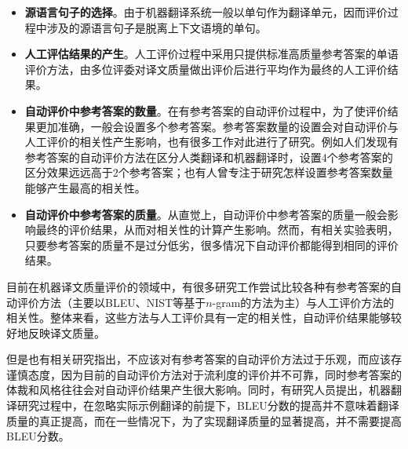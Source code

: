 \begin{itemize}
\vspace{0.5em}
\item {\small\sffamily\bfseries{源语言句子的选择}}。由于机器翻译系统一般以单句作为翻译单元，因而评价过程中涉及的源语言句子是脱离上下文语境的单句。
\vspace{0.5em}
\item {\small\sffamily\bfseries{人工评估结果的产生}}。人工评价过程中采用只提供标准高质量参考答案的单语评价方法，由多位评委对译文质量做出评价后进行平均作为最终的人工评价结果。
\vspace{0.5em}
\item {\small\sffamily\bfseries{自动评价中参考答案的数量}}。在有参考答案的自动评价过程中，为了使评价结果更加准确，一般会设置多个参考答案。参考答案数量的设置会对自动评价与人工评价的相关性产生影响，也有很多工作对此进行了研究。例如人们发现有参考答案的自动评价方法在区分人类翻译和机器翻译时，设置4个参考答案的区分效果远远高于2个参考答案；也有人曾专注于研究怎样设置参考答案数量能够产生最高的相关性。
\vspace{0.5em}
\item {\small\sffamily\bfseries{自动评价中参考答案的质量}}。从直觉上，自动评价中参考答案的质量一般会影响最终的评价结果，从而对相关性的计算产生影响。然而，有相关实验表明，只要参考答案的质量不是过分低劣，很多情况下自动评价都能得到相同的评价结果。
\vspace{0.5em}
\end{itemize}

\parinterval 目前在机器译文质量评价的领域中，有很多研究工作尝试比较各种有参考答案的自动评价方法（主要以BLEU、NIST等基于$n$-gram的方法为主）与人工评价方法的相关性。整体来看，这些方法与人工评价具有一定的相关性，自动评价结果能够较好地反映译文质量。

\parinterval 但是也有相关研究指出，不应该对有参考答案的自动评价方法过于乐观，而应该存谨慎态度，因为目前的自动评价方法对于流利度的评价并不可靠，同时参考答案的体裁和风格往往会对自动评价结果产生很大影响。同时，有研究人员提出，机器翻译研究过程中，在忽略实际示例翻译的前提下，BLEU分数的提高并不意味着翻译质量的真正提高，而在一些情况下，为了实现翻译质量的显著提高，并不需要提高BLEU分数。


